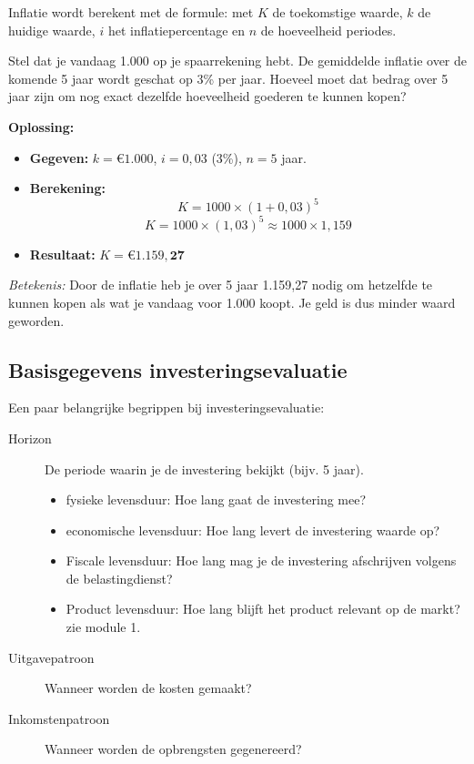 \documentclass[a4paper,11pt]{article}
\begin{document}
Inflatie wordt berekent met de formule:
{met $K$ de toekomstige waarde, $k$ de huidige waarde, 
$i$ het inflatiepercentage en $n$ de hoeveelheid periodes.}

\begin{oefenblok}[title=Voorbeeldoefening: Koopkracht over tijd]
Stel dat je vandaag 1.000 op je spaarrekening hebt. De gemiddelde inflatie over de komende 5 jaar wordt geschat op 3\% per jaar. Hoeveel moet dat bedrag over 5 jaar zijn om nog exact dezelfde hoeveelheid goederen te kunnen kopen?

\textbf{Oplossing:}
\begin{itemize}
    \item \textbf{Gegeven:} $k = \text{€}1.000$, $i = 0,03$ (3\%), $n = 5$ jaar.
    \item \textbf{Berekening:}
    \[ K = 1000 \times (1 + 0,03)^5 \]
    \[ K = 1000 \times (1,03)^5 \approx 1000 \times 1,159 \]
    \item \textbf{Resultaat:} $K = \mathbf{\text{€}1.159,27}$
\end{itemize}
\textit{Betekenis:} Door de inflatie heb je over 5 jaar 1.159,27 nodig om hetzelfde te kunnen kopen als wat je vandaag voor 1.000 koopt. Je geld is dus minder waard geworden.
\end{oefenblok}


\subsection{Basisgegevens investeringsevaluatie}
Een paar belangrijke begrippen bij investeringsevaluatie:
\begin{description}
    \item[Horizon] De periode waarin je de investering bekijkt (bijv. 5 jaar).
    \begin{itemize}
        \item fysieke levensduur: Hoe lang gaat de investering mee?
        \item economische levensduur: Hoe lang levert de investering waarde op?
        \item Fiscale levensduur: Hoe lang mag je de investering afschrijven volgens de belastingdienst?
        \item Product levensduur: Hoe lang blijft het product relevant op de markt? zie module 1.
    \end{itemize}
    \item[Uitgavepatroon] Wanneer worden de kosten gemaakt?
    \item[Inkomstenpatroon] Wanneer worden de opbrengsten gegenereerd?
    \end{description}
\end{document}

